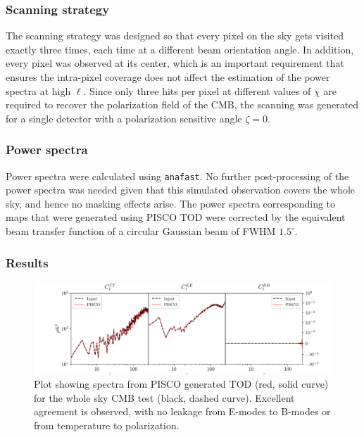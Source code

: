 \documentclass[a4paper,11pt]{article}
\begin{document}
\subsubsection{Scanning strategy}

The scanning strategy was designed so that every pixel on the sky gets visited exactly three times, each time at a different beam orientation angle. In addition, every pixel was observed at its center, which is an important requirement that ensures the intra-pixel coverage does not affect the estimation of the power spectra at high $\ell$. Since only three hits per pixel at different values of $\chi$ are required to recover the polarization field of the CMB, the scanning was generated for a single detector with a polarization sensitive angle $\zeta=0$.

\subsubsection{Power spectra}

Power spectra were calculated using \texttt{anafast}. No further post-processing of the power spectra was needed given that this simulated observation covers the whole sky, and hence no masking effects arise. The power spectra corresponding to maps that were generated using PISCO TOD were corrected by the equivalent beam transfer function of a circular Gaussian beam of FWHM $1.5^\circ$. 

\subsubsection{Results}

\begin{figure}
	\centering
	\includegraphics[width=1\linewidth]{figures/cmb_r0d00_CLASS_wholeskytest.pdf}
	\caption{Plot showing spectra from PISCO generated TOD (red, solid curve) for the whole sky CMB test (black, dashed curve). Excellent agreement is observed, with no leakage from E-modes to B-modes or from temperature to polarization. }
	\label{fig::pisco4wholesky}
\end{figure}
\end{document}
